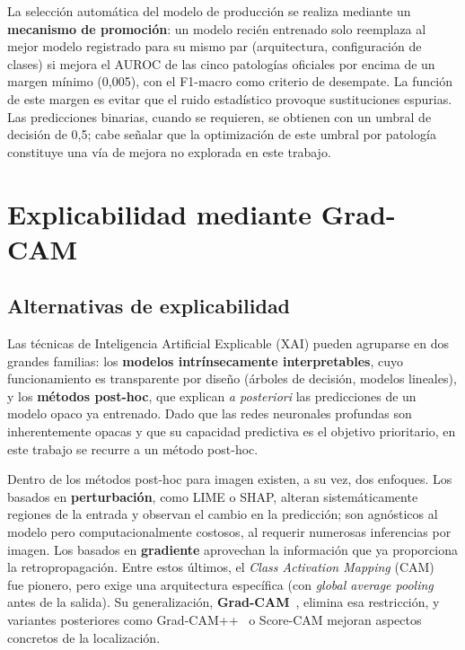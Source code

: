 La selección automática del modelo de producción se realiza mediante un
\textbf{mecanismo de promoción}: un modelo recién entrenado solo reemplaza al
mejor modelo registrado para su mismo par (arquitectura, configuración de clases)
si mejora el AUROC de las cinco patologías oficiales por encima de un margen
mínimo (0,005), con el F1-macro como criterio de desempate. La función de este
margen es evitar que el ruido estadístico provoque sustituciones espurias. Las
predicciones binarias, cuando se requieren, se obtienen con un umbral de decisión
de 0,5; cabe señalar que la optimización de este umbral por patología constituye
una vía de mejora no explorada en este trabajo.


\section{Explicabilidad mediante Grad-CAM}
\label{sec::mm_gradcam}

\subsection{Alternativas de explicabilidad}

Las técnicas de Inteligencia Artificial Explicable (XAI) pueden agruparse en dos
grandes familias: los \textbf{modelos intrínsecamente interpretables}, cuyo
funcionamiento es transparente por diseño (árboles de decisión, modelos
lineales), y los \textbf{métodos post-hoc}, que explican \textit{a posteriori} las
predicciones de un modelo opaco ya entrenado. Dado que las redes neuronales
profundas son inherentemente opacas y que su capacidad predictiva es el objetivo
prioritario, en este trabajo se recurre a un método post-hoc.

Dentro de los métodos post-hoc para imagen existen, a su vez, dos enfoques. Los
basados en \textbf{perturbación}, como LIME o SHAP, alteran sistemáticamente
regiones de la entrada y observan el cambio en la predicción; son agnósticos al
modelo pero computacionalmente costosos, al requerir numerosas inferencias por
imagen. Los basados en \textbf{gradiente} aprovechan la información que ya
proporciona la retropropagación. Entre estos últimos, el \textit{Class Activation
Mapping} (CAM)~\cite{zhouLearningDeepFeatures2016} fue pionero, pero exige una
arquitectura específica (con \textit{global average pooling} antes de la salida).
Su generalización, \textbf{Grad-CAM}~\cite{selvarajuGradCAMVisualExplanations2017},
elimina esa restricción, y variantes posteriores como
Grad-CAM++~\cite{chattopadhyayGradCAMpp2018} o Score-CAM mejoran aspectos
concretos de la localización.

